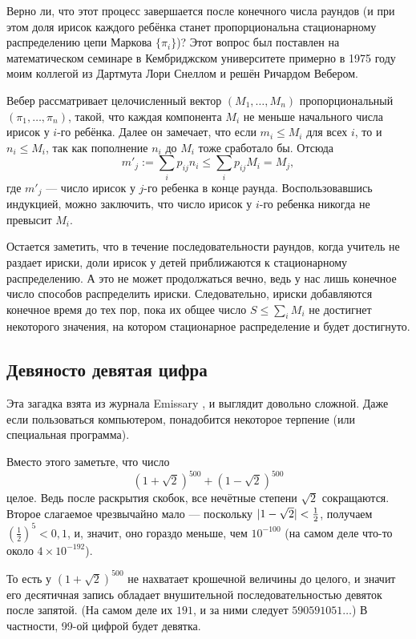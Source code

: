 Верно ли, что этот процесс завершается после конечного числа раундов
(и при этом доля ирисок каждого ребёнка станет пропорциональна стационарному распределению цепи Маркова $\{\pi_i\}$)?
Этот вопрос был поставлен на математическом семинаре в Кембриджском университете примерно в 1975 году моим коллегой из Дартмута Лори Снеллом и решён Ричардом Вебером.

Вебер рассматривает целочисленный вектор $(M_1, \dots , M_n)$ пропорциональный $(\pi_1, \dots , \pi_n)$, такой, что каждая компонента $M_i$ не меньше начального числа ирисок у $i$-го ребёнка.
Далее он замечает, что если $m_i \leqslant M_i$ для всех $i$, то и $n_i \leqslant M_i$, так как пополнение $n_i$ до $M_i$ тоже сработало бы.
Отсюда 
\[m'_j
:=
\sum_i p_{ij} n_i
\leqslant
\sum_i p_{ij} M_i
=
M_j,\] где $m'_j$ --- число ирисок у $j$-го ребенка в конце раунда.
Воспользовавшись индукцией, можно заключить, что число ирисок у $i$-го ребенка никогда не превысит $M_i$.

Остается заметить, что в течение последовательности раундов, когда учитель не раздает ириски, доли ирисок у детей приближаются к стационарному распределению.
А это не может продолжаться вечно, ведь у нас лишь конечное число способов распределить ириски.
Следовательно, ириски добавляются конечное время до тех пор, пока их общее число $S\leqslant\sum_iM_i$ не достигнет некоторого значения, на котором стационарное распределение и будет достигнуто.

\subsection*{Девяносто девятая цифра}

Эта загадка взята из журнала Emissary \cite[осень 1999]{3}, и выглядит довольно сложной.
Даже если пользоваться компьютером, понадобится некоторое терпение (или специальная программа).

Вместо этого заметьте, что число
\[(1+\sqrt{2})^{500}+(1-\sqrt{2})^{500}\]
целое.
Ведь после раскрытия скобок, все нечётные степени $\sqrt{2}$ сокращаются.
Второе слагаемое чрезвычайно мало --- поскольку $|1-\sqrt{2}|\z<\tfrac12$, получаем $(\tfrac12)^5<0{,}1$, и, значит, оно гораздо меньше, чем $10^{-100}$ (на самом деле что-то около $4 \times 10^{-192}$).

То есть у $(1+\sqrt{2})^{500}$ не нахватает крошечной величины до целого, и значит его десятичная запись обладает внушительной последовательностью девяток после запятой.
(На самом деле их $191$, и за ними следует $590591051\dots$)
В частности, 99-ой цифрой будет девятка.

